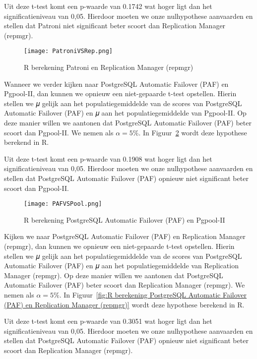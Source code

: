 Uit deze t-test komt een p-waarde van 0.1742 wat hoger ligt dan het significatieniveau van 0,05. Hierdoor moeten we onze nulhypothese aanvaarden en stellen dat Patroni niet significant beter scoort dan Replication Manager (repmgr).

\begin{figure}[!h]
    \centering
    \texttt{[image: PatroniVSRep.png]}
    \caption{R berekening Patroni en Replication Manager (repmgr)}
    \label{fig:R berekening Patroni en Replication Manager (repmgr)}
\end{figure}

Wanneer we verder kijken naar PostgreSQL Automatic Failover (PAF) en Pgpool-II, dan kunnen we opnieuw een niet-gepaarde t-test opstellen. Hierin stellen we 𝜇 gelijk aan het populatiegemiddelde van de scores van PostgreSQL Automatic Failover (PAF) en 𝜇 aan het populatiegemiddelde van Pgpool-II. Op deze manier willen we aantonen dat PostgreSQL Automatic Failover (PAF) beter scoort dan Pgpool-II. We nemen als $\alpha = 5\%$. In Figuur~\ref{fig:R berekening PostgreSQL Automatic Failover (PAF) en Pgpool-II} wordt deze hypothese berekend in R.

Uit deze t-test komt een p-waarde van 0.1908 wat hoger ligt dan het significatieniveau van 0,05. Hierdoor moeten we onze nulhypothese aanvaarden en stellen dat PostgreSQL Automatic Failover (PAF) opnieuw niet significant beter scoort dan Pgpool-II.

\begin{figure}[!h]
    \centering
    \texttt{[image: PAFVSPool.png]}
    \caption{R berekening PostgreSQL Automatic Failover (PAF) en Pgpool-II}
    \label{fig:R berekening PostgreSQL Automatic Failover (PAF) en Pgpool-II}
\end{figure}

Kijken we naar PostgreSQL Automatic Failover (PAF) en Replication Manager (repmgr), dan kunnen we opnieuw een niet-gepaarde t-test opstellen. Hierin stellen we 𝜇 gelijk aan het populatiegemiddelde van de scores van PostgreSQL Automatic Failover (PAF) en 𝜇 aan het populatiegemiddelde van Replication Manager (repmgr). Op deze manier willen we aantonen dat PostgreSQL Automatic Failover (PAF) beter scoort dan Replication Manager (repmgr). We nemen als $\alpha = 5\%$. In Figuur~\ref{fig:R berekening PostgreSQL Automatic Failover (PAF) en Replication Manager (repmgr)} wordt deze hypothese berekend in R.

Uit deze t-test komt een p-waarde van 0.3051 wat hoger ligt dan het significatieniveau van 0,05. Hierdoor moeten we onze nulhypothese aanvaarden en stellen dat PostgreSQL Automatic Failover (PAF) opnieuw niet significant beter scoort dan Replication Manager (repmgr).


